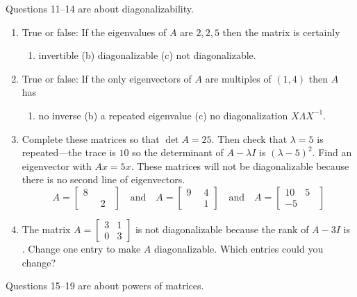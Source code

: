 \documentclass[14pt, a4paper]{article}
\begin{document}
\noindent Questions 11--14 are about diagonalizability.

\begin{enumerate}[resume]
    \item True or false: If the eigenvalues of $A$ are $2, 2, 5$ then the matrix is certainly
          \begin{enumerate}
              \item invertible \quad (b) diagonalizable \quad (c) not diagonalizable.
          \end{enumerate}

    \item True or false: If the only eigenvectors of $A$ are multiples of $(1, 4)$ then $A$ has
          \begin{enumerate}
              \item no inverse \quad (b) a repeated eigenvalue \quad (c) no diagonalization $X \Lambda X^{-1}$.
          \end{enumerate}

    \item Complete these matrices so that $\det A = 25$. Then check that $\lambda = 5$ is repeated---the trace is $10$ so the determinant of $A - \lambda I$ is $(\lambda - 5)^2$. Find an eigenvector with $Ax = 5x$. These matrices will not be diagonalizable because there is no second line of eigenvectors.
          \[
              A = \begin{bmatrix} 8 & \quad \\ \quad & 2 \end{bmatrix} \quad \text{and} \quad A = \begin{bmatrix} 9 & 4 \\ \quad & 1 \end{bmatrix} \quad \text{and} \quad A = \begin{bmatrix} 10 & 5 \\ -5 & \quad \end{bmatrix}
          \]

    \item The matrix $A = \begin{bmatrix} 3 & 1 \\ 0 & 3 \end{bmatrix}$ is not diagonalizable because the rank of $A - 3I$ is \underline{\hspace{1cm}} . Change one entry to make $A$ diagonalizable. Which entries could you change?
\end{enumerate}

\noindent Questions 15--19 are about powers of matrices.
\end{document}
